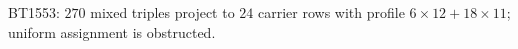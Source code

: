 \begin{center}\small
BT1553: $270$ mixed triples project to $24$ carrier rows with profile $6\times12+18\times11$; uniform assignment is obstructed.
\end{center}
